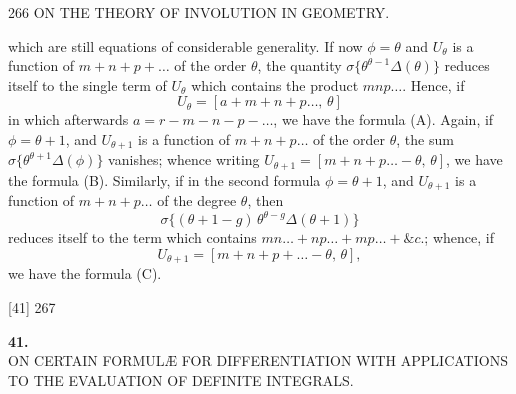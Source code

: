 \documentclass[11pt]{article}
\begin{document}
\begin{center}\small 266 \quad ON THE THEORY OF INVOLUTION IN GEOMETRY. \quad [40]\end{center}

\noindent which are still equations of considerable generality. If now $\phi = \theta$ and $U_\theta$ is a function of $m+n+p+\dots$ of the order $\theta$, the quantity $\sigma\{\theta^{\theta-1}\Delta(\theta)\}$ reduces itself to the single term of $U_\theta$ which contains the product $mnp\dots$. Hence, if
\[
  U_\theta = [a + m + n + p \dots, \, \theta]
\]
in which afterwards $a = r - m - n - p - \dots$, we have the formula (A). Again, if $\phi = \theta+1$, and $U_{\theta+1}$ is a function of $m+n+p\dots$ of the order $\theta$, the sum $\sigma\{\theta^{\theta+1}\Delta(\phi)\}$ vanishes; whence writing $U_{\theta+1} = [m + n + p \dots - \theta,\, \theta]$, we have the formula (B). Similarly, if in the second formula $\phi = \theta+1$, and $U_{\theta+1}$ is a function of $m+n+p\dots$ of the degree $\theta$, then
\[
  \sigma\{(\theta + 1 - g)\,\theta^{\theta-g}\Delta(\theta+1)\}
\]
reduces itself to the term which contains $mn\dots + np\dots + mp\dots + \&c.$; whence, if
\[
  U_{\theta+1} = [m + n + p + \dots - \theta,\, \theta],
\]
we have the formula (C).

\vspace{2em}

\begin{center}\small [41] \hfill 267\end{center}

\vspace{2em}
\begin{center}
{\Large\bfseries 41.}\\[1em]
{\large ON CERTAIN FORMUL\AE{} FOR DIFFERENTIATION WITH APPLICATIONS\\
TO THE EVALUATION OF DEFINITE INTEGRALS.}
\end{center}


\bigskip
\end{document}
